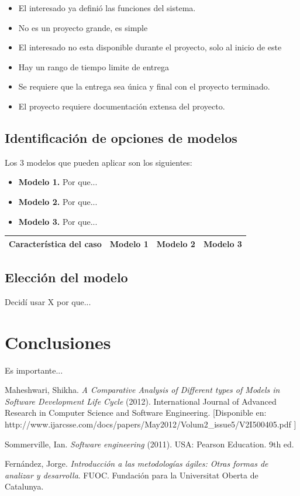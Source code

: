 \documentclass[spanish,12pt,letterpapper]{article}
\begin{document}
   \begin{itemize}
   \item El interesado ya definió las funciones del sistema.
   \item No es un proyecto grande, es simple
   \item El interesado no esta disponible durante el proyecto, solo al inicio de este
   \item Hay un rango de tiempo limite de entrega
   \item Se requiere que la entrega sea única y final con el proyecto terminado.
   \item El proyecto requiere documentación extensa del proyecto.
   \end{itemize}
   
   \subsection{Identificación de opciones de modelos}
   
   Los 3 modelos que pueden aplicar son los siguientes:
   
   \begin{itemize}
   \item \textbf{Modelo 1.} Por que...
   \item \textbf{Modelo 2.} Por que...
   \item \textbf{Modelo 3.} Por que...
   \end{itemize}
   
   \begin{tabular}{|p{3cm}|p{3cm}|p{3cm}|p{3cm}|}
   \hline
   \textbf{Característica del caso} & \textbf{Modelo 1} & \textbf{Modelo 2} & \textbf{Modelo 3} \\
   \hline
   \end{tabular}
   
   \subsection{Elección del modelo}
   Decidí usar X por que...
   
   \section{Conclusiones}
   Es importante...

	
	\pagebreak
	\begin{thebibliography}{9}
	  Maheshwari, Shikha. 
		\emph{A Comparative Analysis of Different types of Models in Software Development Life Cycle} (2012). International Journal of Advanced Research in Computer Science and Software Engineering. [Disponible en: http://www.ijarcsse.com/docs/papers/May2012/Volum2\_issue5/V2I500405.pdf ]
		
		  Sommerville, Ian. 
		\emph{Software engineering} (2011). USA:  Pearson Education. 9th ed. 
		
		  Fernández, Jorge. 
		\emph{Introducción a las metodologías ágiles: Otras formas de analizar y desarrolla}. FUOC. Fundación para la Universitat Oberta de Catalunya. 
		
	\end{thebibliography}
	
\end{document}
